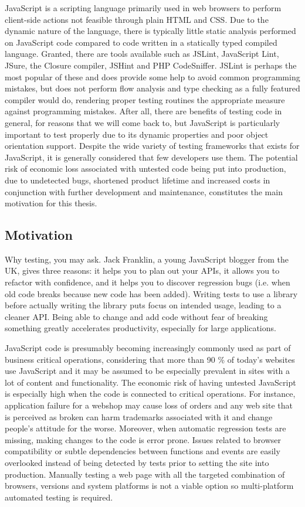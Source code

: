 \documentclass[11pt]{article}
\begin{document}
JavaScript is a scripting language primarily used in web browsers to perform client-side actions not feasible through plain HTML and CSS. Due to the dynamic nature of the language, there is typically little static analysis performed on JavaScript code compared to code written in a statically typed compiled language. Granted, there are tools available such as JSLint, JavaScript Lint, JSure, the Closure compiler, JSHint and PHP CodeSniffer. JSLint is perhaps the most popular of these and does provide some help to avoid common programming mistakes, but does not perform flow analysis\cite{JSLint} and type checking as a fully featured compiler would do, rendering proper testing routines the appropriate measure against programming mistakes. After all, there are benefits of testing code in general, for reasons that we will come back to, but JavaScript is particularly important to test properly due to its dynamic properties and poor object orientation support. Despite the wide variety of testing frameworks that exists for JavaScript, it is generally considered that few developers use them. The potential risk of economic loss associated with untested code being put into production, due to undetected bugs, shortened product lifetime and increased costs in conjunction with further development and maintenance, constitutes the main motivation for this thesis.

\subsection{Motivation}

Why testing, you may ask. Jack Franklin, a young JavaScript blogger from the UK, gives three reasons: it helps you to plan out your APIs, it allows you to refactor with confidence, and it helps you to discover regression bugs (i.e. when old code breaks because new code has been added). Writing tests to use a library before actually writing the library puts focus on intended usage, leading to a cleaner API. Being able to change and add code without fear of breaking something greatly accelerates productivity, especially for large applications. \cite{JackFranklin}

JavaScript code is presumably becoming increasingly commonly used as part of business critical operations, considering that more than 90 \% of today's websites use JavaScript\cite{BusinessJavascript} and it may be assumed to be especially prevalent in sites with a lot of content and functionality. The economic risk of having untested JavaScript is especially high when the code is connected to critical operations. For instance, application failure for a webshop may cause loss of orders and any web site that is perceived as broken can harm trademarks associated with it and change people's attitude for the worse. Moreover, when automatic regression tests are missing, making changes to the code is error prone. Issues related to browser compatibility or subtle dependencies between functions and events are easily overlooked instead of being detected by tests prior to setting the site into production. Manually testing a web page with all the targeted combination of browsers, versions and system platforms is not a viable option\cite{TestSwarm} so multi-platform automated testing is required.
\end{document}
